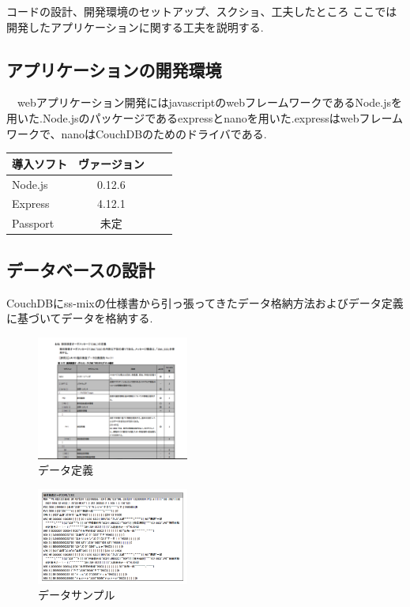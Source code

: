 コードの設計、開発環境のセットアップ、スクショ、工夫したところ
ここでは開発したアプリケーションに関する工夫を説明する.

\subsection{アプリケーションの開発環境}
　webアプリケーション開発にはjavascriptのwebフレームワークであるNode.jsを用いた.Node.jsのパッケージであるexpressとnanoを用いた.expressはwebフレームワークで、nanoはCouchDBのためのドライバである.

\begin{table}[htb]
	\begin{tabular}{|l|c|r|r|}\hline
	導入ソフト & ヴァージョン \\ \hline \hline
	Node.js & 0.12.6 \\ \hline
	Express & 4.12.1 \\ \hline
	Passport & 未定 \\ \hline
	\end{tabular}
\end{table}


\subsection{データベースの設計}
	CouchDBにss-mixの仕様書から引っ張ってきたデータ格納方法およびデータ定義\cite{bibi1}に基づいてデータを格納する.
	\begin{figure}[htbp]
		\begin{center}
			\includegraphics[width=5cm, bb=0 0 645 790]{ss-mix_sample.png} %
		\end{center}
		\caption{データ定義}
		\label{ss-mix_sample}
	\end{figure}

	\begin{figure}[htbp]
		\begin{center}
			\includegraphics[width=5cm, bb=0 0 437 688]{ss-mix_sampledata.png}
		\end{center}
		\caption{データサンプル}
		\label{ss-mix_sampledata}
	\end{figure}

